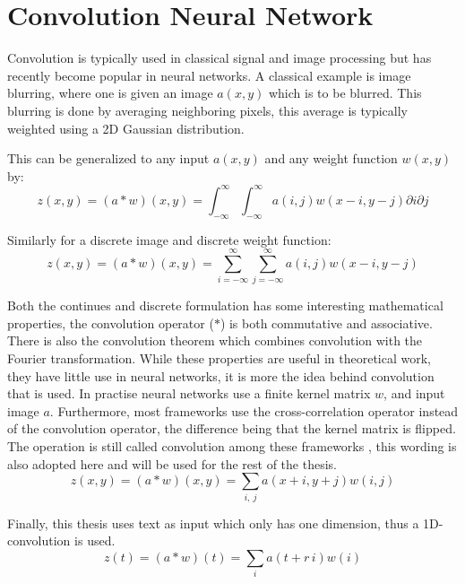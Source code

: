 \section{Convolution Neural Network}

Convolution is typically used in classical signal and image processing but has recently become popular in neural networks. A classical example is image blurring, where one is given an image $a(x, y)$ which is to be blurred. This blurring is done by averaging neighboring pixels, this average is typically weighted using a 2D Gaussian distribution.

This can be generalized to any input $a(x, y)$ and any weight function $w(x, y)$ by:
\begin{equation}
z(x, y) = (a * w)(x, y) = \int_{-\infty}^\infty \int_{-\infty}^\infty a(i, j) w(x - i, y - j) \partial i \partial j
\end{equation}

Similarly for a discrete image and discrete weight function:
\begin{equation}
z(x, y) = (a * w)(x, y) = \sum_{i = -\infty}^\infty \sum_{j = -\infty}^\infty a(i, j) w(x - i, y - j)
\end{equation}

Both the continues and discrete formulation has some interesting mathematical properties, the convolution operator ($*$) is both commutative and associative. There is also the convolution theorem which combines convolution with the Fourier transformation. While these properties are useful in theoretical work, they have little use in neural networks, it is more the idea behind convolution that is used. In practise neural networks use a finite kernel matrix $w$, and input image $a$. Furthermore, most frameworks use the cross-correlation operator instead of the convolution operator, the difference being that the kernel matrix is flipped. The operation is still called convolution among these frameworks \cite{deep-learning}, this wording is also adopted here and will be used for the rest of the thesis.
\begin{equation}
z(x, y) = (a * w)(x, y) = \sum_{i,\ j} a(x + i, y + j) w(i, j)
\end{equation}

Finally, this thesis uses text as input which only has one dimension, thus a 1D-convolution is used.
\begin{equation}
z(t) = (a * w)(t) = \sum_{i} a(t+r\,i) w(i)
\end{equation}

